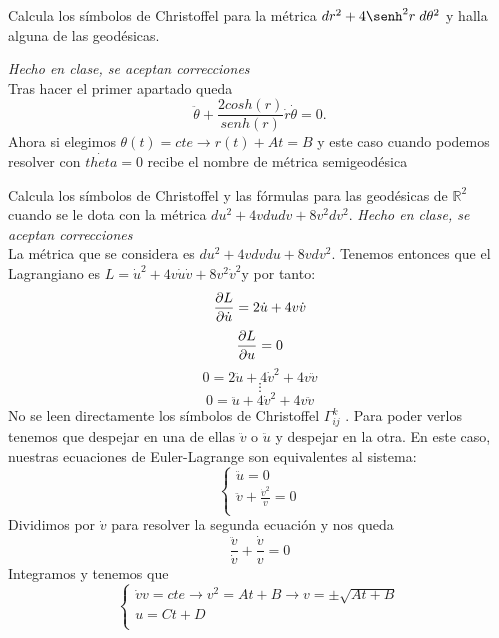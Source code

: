 \begin{problem}[12] Calcula los símbolos de Christoffel
	para la métrica $dr^2+4\senh^2r\; d\theta^2
	$ y halla alguna de 
	las geodésicas.
	
	
	\solution\textit{Hecho en clase, se aceptan correcciones}\\ Tras hacer el primer apartado queda $$\ddot{\theta}+\frac{2cosh(r)}{senh(r)}\dot{r}\dot{\theta}=0.$$Ahora si elegimos $\theta(t)=cte\longrightarrow r(t)+At=B$ y este caso cuando podemos resolver con $\dot{theta}=0$ recibe el nombre de métrica semigeodésica
	
\end{problem}
\begin{problem}[13] Calcula los símbolos de Christoffel y las fórmulas para las geodésicas de $ℝ^2$ cuando se le dota con la
	métrica
	$
	du^2+4vdudv+8v^2dv^2.
	$
	\solution\textit{Hecho en clase, se aceptan correcciones}\\ La métrica que se considera es $du^2+4vdvdu+8vdv^2$. Tenemos entonces que el Lagrangiano es $L=\dot{u}^2+4v\dot{u}\dot{v}+8v^2\dot{v}^2$y por tanto: $$\pdv{L}{\dot{u}}=2\dot{u}+4v\dot{v}$$ $$\pdv{L}{u}=0$$ $$0=2\ddot{u}+4\dot{v}^2+4v\ddot{v}$$ $$\vdots$$ $$0=\ddot{u}+4\dot{v}^2+4v\ddot{v}$$ No se leen directamente los símbolos de Christoffel $\Gamma^k_{ij}$ . Para poder verlos tenemos que despejar en una de ellas $\ddot{v}$ o $\ddot{u}$ y despejar en la otra. En este caso, nuestras ecuaciones de Euler-Lagrange son equivalentes al sistema: $$\begin{cases}
	\ddot{u}=0\\
	\ddot{v}+\frac{\dot{v}^2}{v}=0\\
	\end{cases}$$ Dividimos por $\dot{v}$ para resolver la segunda ecuación y nos queda $$\frac{\ddot{v}}{\dot{v}}+\frac{\dot{v}}{v}=0$$ Integramos y tenemos que $$\begin{cases}
	\dot{v}v=cte\longrightarrow v^2=At+B\longrightarrow v=\pm\sqrt{At+B}\\u=Ct+D\\
	\end{cases}$$
\end{problem}
